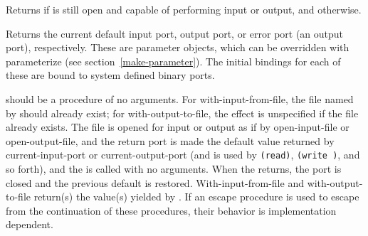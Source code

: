 \begin{entry}{%
}

Returns \schtrue{} if  is still open and capable of
performing input or output, and \schfalse{} otherwise.


\end{entry}


\begin{entry}{%
}

Returns the current default input port, output port, or error port (an
output port), respectively.  These are parameter objects, which can be
overridden with {\cf parameterize} (see
section~\ref{make-parameter}). The initial bindings for each of these
are bound to system defined binary ports.

\end{entry}


\begin{entry}{%
}

 should be a procedure of no arguments.
For {\cf with-input-from-file},
the file named by  should already exist; for
{\cf with-output-to-file},
the effect is unspecified if the file
already exists.
The file is opened for input or output
as if by {\cf open-input-file} or {\cf open-output-file}, 
and the return port is made the default value returned by
{\cf current-input-port} or {\cf current-output-port}
(and is used by {\tt (read)}, {\tt (write )}, and so forth),
and the
 is called with no arguments.  When the  returns,
the port is closed and the previous default is restored.
{\cf With-input-from-file} and {\cf with-output-to-file} return(s) the
value(s) yielded by .
If an escape procedure
is used to escape from the continuation of these procedures, their
behavior is implementation dependent.




\end{entry}


